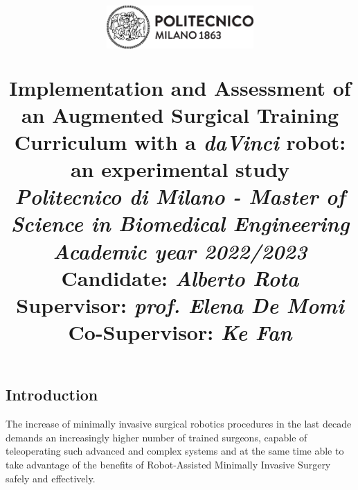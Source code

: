 \documentclass{article}
\title{
\begin{figure}[h!]
\centering
\includegraphics[width=0.5\textwidth]{images/logo_polimi_scritta2.eps}
\end{figure}
\textbf{Implementation and Assessment of an Augmented Surgical Training Curriculum with a \textit{daVinci} robot: an experimental study}
\\
\vspace{0.5cm}\large{\textit{Politecnico di Milano - Master of Science in Biomedical Engineering}}
\\
\vspace{0.5cm}\textit{\small{Academic year 2022/2023}}\vspace{0.5cm}\\
{\large \textbf{Candidate: \textit{Alberto Rota}}\\
\textbf{Supervisor: \textit{prof. Elena De Momi}}\\
\textbf{Co-Supervisor: \textit{Ke Fan}}}}
\author{}
\date{}
\begin{document}
\maketitle
\begin{multicols}{2}
\section{Introduction}

The increase of minimally invasive surgical robotics procedures in the last decade demands an increasingly higher number of trained surgeons, capable of teleoperating such advanced and complex systems and at the same time able to take advantage of the benefits of Robot-Assisted Minimally Invasive Surgery safely and effectively. 



\end{multicols}
\end{document}
